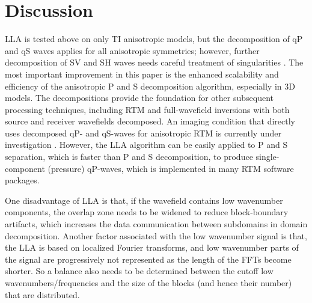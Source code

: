 \documentclass[manuscript,ulem,graphix,revised]{geophysics}
\begin{document}
\section{Discussion}
\indent\indent
LLA is tested above on only TI anisotropic models, but the decomposition of qP and qS waves applies for all anisotropic symmetries; however, further decomposition of SV and SH waves needs careful treatment of singularities \mbox{\citep{cheng16, Sripanich16}}. The most important improvement in this paper is the enhanced scalability and efficiency of the anisotropic P and S decomposition algorithm, especially in 3D models. The decompositions provide the foundation for other subsequent processing techniques, including RTM and full-wavefield inversions with both source and receiver wavefields decomposed. An imaging condition that directly uses decomposed qP- and qS-waves for anisotropic RTM is currently under investigation \citep[e.g.,][]{wang16}. However, the LLA algorithm can be easily applied to P and S separation, which is faster than P and S decomposition, to produce single-component (pressure) qP-waves, which is implemented in many RTM software packages.




One disadvantage of LLA is that, if the wavefield contains low wavenumber components, the overlap zone needs to be widened to reduce block-boundary artifacts, which increases the data communication between subdomains in domain decomposition. Another factor associated with the low wavenumber signal is that, the LLA is based on localized Fourier transforms, and low wavenumber parts of the signal are progressively not represented as the length of the FFTs become shorter. So a balance also needs to be determined between the cutoff low wavenumbers/frequencies and the size of the blocks (and hence their number) that are distributed. 
\end{document}
